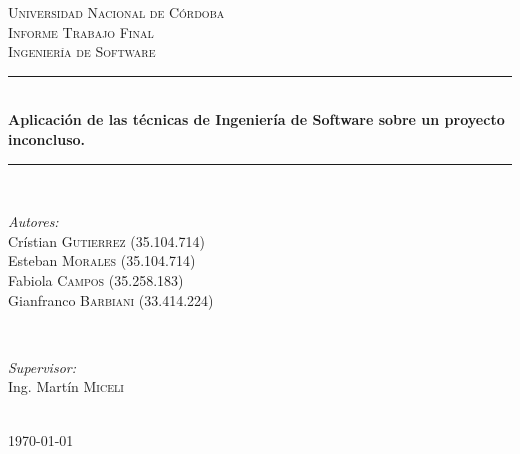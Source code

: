 \documentclass[12pt]{article} %
\begin{document}

\begin{titlepage}

\newcommand{\HRule}{\rule{\linewidth}{0.5mm}} %

\center %

\textsc{\LARGE Universidad Nacional de Córdoba}\\[1.5cm] %
\textsc{\Large Informe Trabajo Final}\\[0.5cm] %
\textsc{\large Ingeniería de Software}\\[0.5cm] %

\HRule \\[0.4cm]
\Large{ \huge \bfseries Aplicación de las técnicas de Ingeniería de Software sobre un proyecto inconcluso.}\par %
\HRule \\[1.5cm]

\begin{minipage}{0.5\textwidth}
\begin{flushleft} \large
\emph{Autores:}\\
Crístian \textsc{Gutierrez} (35.104.714)\\
Esteban \textsc{Morales} (35.104.714)\\
Fabiola \textsc{Campos} (35.258.183)\\
Gianfranco \textsc{Barbiani} (33.414.224)\\
\end{flushleft}
\end{minipage}
~
\begin{minipage}{0.4\textwidth}
\begin{flushright} \large
\emph{Supervisor:} \\
Ing. Martín \textsc{Miceli}
\end{flushright}
\end{minipage}\\[4cm]

{\large \today}\\[3cm] %


\vfill %
\restoregeometry
\end{titlepage}
\end{document}
